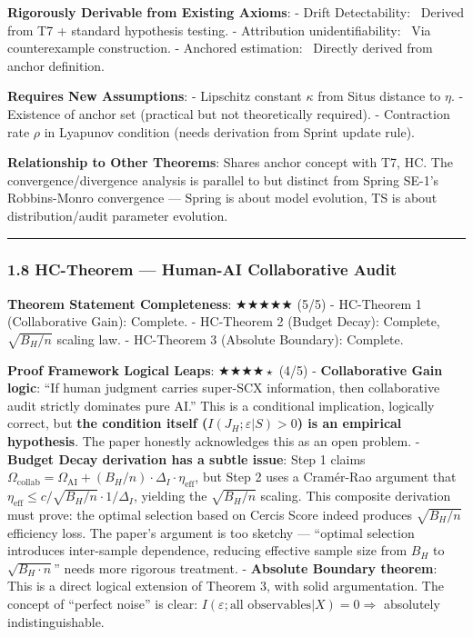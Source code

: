 \documentclass[
  12pt,
]{article}
\begin{document}
\textbf{Rigorously Derivable from Existing Axioms}:
- Drift Detectability: \checkmark\ Derived from T7 + standard hypothesis testing.
- Attribution unidentifiability: \checkmark\ Via counterexample construction.
- Anchored estimation: \checkmark\ Directly derived from anchor definition.

\textbf{Requires New Assumptions}:
- Lipschitz constant $\kappa$ from Situs distance to $\eta$.
- Existence of anchor set (practical but not theoretically required).
- Contraction rate $\rho$ in Lyapunov condition (needs derivation from Sprint update rule).

\textbf{Relationship to Other Theorems}: Shares anchor concept with T7, HC. The convergence/divergence analysis is parallel to but distinct from Spring SE-1's Robbins-Monro convergence --- Spring is about model evolution, TS is about distribution/audit parameter evolution.

\begin{center}\rule{0.5\linewidth}{0.5pt}\end{center}

\subsubsection{1.8 HC-Theorem --- Human-AI Collaborative Audit}\label{hc-theorem-human-ai-collaborative-audit}

\textbf{Theorem Statement Completeness}: $\bigstar\bigstar\bigstar\bigstar\bigstar$ (5/5)
- HC-Theorem 1 (Collaborative Gain): Complete.
- HC-Theorem 2 (Budget Decay): Complete, $\sqrt{B_H/n}$ scaling law.
- HC-Theorem 3 (Absolute Boundary): Complete.

\textbf{Proof Framework Logical Leaps}: $\bigstar\bigstar\bigstar\bigstar{\scriptstyle\star}$ (4/5)
- \textbf{Collaborative Gain logic}: ``If human judgment carries super-SCX information, then collaborative audit strictly dominates pure AI.'' This is a conditional implication, logically correct, but \textbf{the condition itself ($I(J_H;\varepsilon|S)>0$) is an empirical hypothesis}. The paper honestly acknowledges this as an open problem.
- \textbf{Budget Decay derivation has a subtle issue}: Step 1 claims $\Omega_{\text{collab}} = \Omega_{\text{AI}} + (B_H/n)\cdot\Delta_I\cdot\eta_{\text{eff}}$, but Step 2 uses a Cram\'{e}r-Rao argument that $\eta_{\text{eff}} \leq c/\sqrt{B_H/n}\cdot 1/\Delta_I$, yielding the $\sqrt{B_H/n}$ scaling. This composite derivation must prove: the optimal selection based on Cercis Score indeed produces $\sqrt{B_H/n}$ efficiency loss. The paper's argument is too sketchy --- ``optimal selection introduces inter-sample dependence, reducing effective sample size from $B_H$ to $\sqrt{B_H\cdot n}$'' needs more rigorous treatment.
- \textbf{Absolute Boundary theorem}: This is a direct logical extension of Theorem 3, with solid argumentation. The concept of ``perfect noise'' is clear: $I(\varepsilon;\text{all observables}|X)=0 \Rightarrow$ absolutely indistinguishable.
\end{document}
